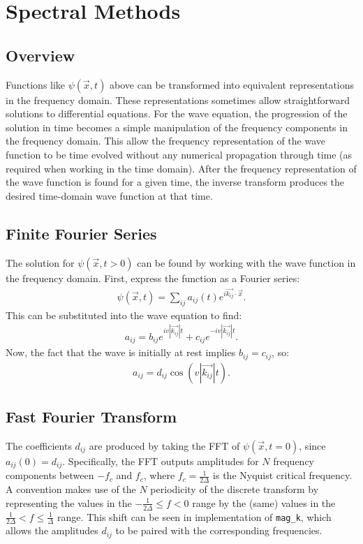 \documentclass[12pt]{article}
\begin{document}
\section{Spectral Methods}
\subsection{Overview}
Functions like $\psi(\vec{x}, t)$ above can be transformed into equivalent representations in the frequency domain. These representations sometimes allow straightforward solutions to differential equations. For the wave equation, the progression of the solution in time becomes a simple manipulation of the frequency components in the frequency domain. This allow the frequency representation of the wave function to be time evolved without any numerical propagation through time (as required when working in the time domain). After the frequency representation of the wave function is found for a given time, the inverse transform produces the desired time-domain wave function at that time.
\subsection{Finite Fourier Series}
The solution for $\psi(\vec{x}, t > 0)$ can be found by working with the wave function in the frequency domain. First, express the function as a Fourier series:
\begin{align*}
\psi(\vec{x}, t) = \sum_{ij}a_{ij}(t) e^{i\vec{k_{ij}} \cdot \vec{x}}.
\end{align*}
This can be substituted into the wave equation to find:
\begin{align*}
a_{ij} = b_{ij} e^{iv|\vec{k_{ij}}|t} + c_{ij} e^{-iv|\vec{k_{ij}}|t}.
\end{align*}
Now, the fact that the wave is initially at rest implies $b_{ij} = c_{ij}$, so:
\begin{align*}
a_{ij} = d_{ij} \cos(v|\vec{k_{ij}}|t).
\end{align*}
\subsection{Fast Fourier Transform}
The coefficients $d_{ij}$ are produced by taking the FFT of $\psi(\vec{x}, t = 0)$, since $a_{ij}(0) = d_{ij}$. Specifically, the FFT outputs amplitudes for $N$ frequency components between $-f_c$ and $f_c$, where $f_c = \frac{1}{2\Delta}$ is the Nyquist critical frequency. A convention makes use of the $N$ periodicity of the discrete transform by representing the values in the $-\frac{1}{2\Delta} \le f < 0$ range by the (same) values in the $\frac{1}{2\Delta} < f \le \frac{1}{\Delta}$ range. This shift can be seen in implementation of \texttt{mag\_k}, which allows the amplitudes $d_{ij}$ to be paired with the corresponding frequencies. \\
\end{document}
